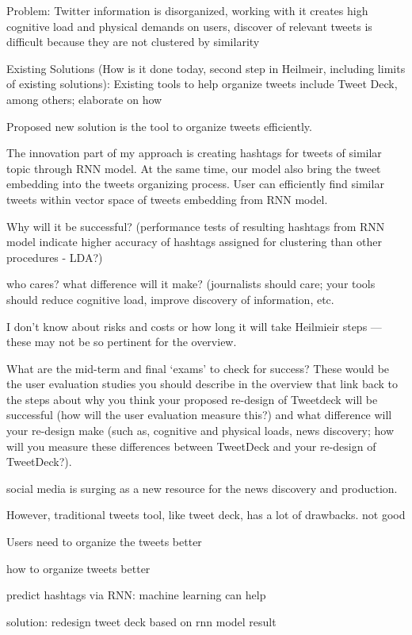 Problem: Twitter information is disorganized, working with it creates high cognitive load and physical demands on users, discover of relevant tweets is difficult because they are not clustered by similarity 

Existing Solutions (How is it done today, second step in Heilmeir, including limits of existing solutions): Existing tools to help organize tweets include Tweet Deck, among others; elaborate on how


Proposed new solution is the tool to organize tweets efficiently. 

The innovation part of my approach is creating hashtags for tweets of similar topic through RNN model. At the same time, our model also bring the tweet embedding into the tweets organizing process.  User can efficiently find similar tweets within vector space of tweets embedding from RNN model. 

Why will it be successful? (performance tests of resulting hashtags from RNN model indicate higher accuracy of hashtags assigned for clustering than other procedures - LDA?)

who cares? what difference will it make?  (journalists should care; your tools should reduce cognitive load, improve discovery of information, etc.

I don’t know about risks and costs or how long it will take Heilmieir steps — these may not be so pertinent for the overview.

What are the mid-term and final ‘exams' to check for success?  These would be the user evaluation studies you should describe in the overview that link back to the steps about why you think your proposed re-design of Tweetdeck will be successful (how will the user evaluation measure this?) and what difference will your re-design make (such as, cognitive and physical loads, news discovery; how will you measure these differences between TweetDeck and your re-design of TweetDeck?).



social media is surging as a new resource for the news discovery and production. 

However, traditional tweets tool, like tweet deck, has a lot of drawbacks.  not good

Users need to organize the tweets better

how to organize tweets better

predict hashtags via RNN: machine learning can help

solution: redesign tweet deck based on rnn model result

